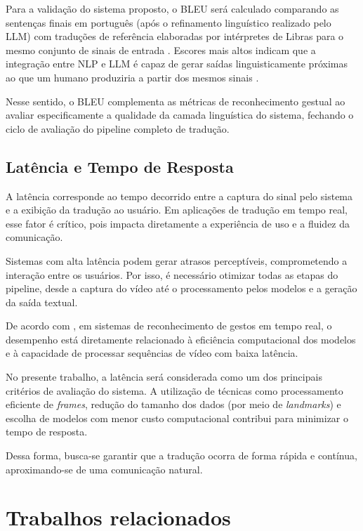 \documentclass[
    12pt,                %
    openright,           %
    oneside,             %
    a4paper,             %
    english,             %
    brazil               %
]{abntex2}
\begin{document}
Para a validação do sistema proposto, o BLEU será calculado comparando as sentenças finais em português (após o refinamento linguístico realizado pelo LLM) com traduções de referência elaboradas por intérpretes de Libras para o mesmo conjunto de sinais de entrada \cite{Touvron2023}. Escores mais altos indicam que a integração entre NLP e LLM é capaz de gerar saídas linguisticamente próximas ao que um humano produziria a partir dos mesmos sinais \cite{Touvron2023}.

Nesse sentido, o BLEU complementa as métricas de reconhecimento gestual ao avaliar especificamente a qualidade da camada linguística do sistema, fechando o ciclo de avaliação do pipeline completo de tradução.

\subsection{Latência e Tempo de Resposta}

A latência corresponde ao tempo decorrido entre a captura do sinal pelo sistema e a exibição da tradução ao usuário. Em aplicações de tradução em tempo real, esse fator é crítico, pois impacta diretamente a experiência de uso e a fluidez da comunicação.

Sistemas com alta latência podem gerar atrasos perceptíveis, comprometendo a interação entre os usuários. Por isso, é necessário otimizar todas as etapas do pipeline, desde a captura do vídeo até o processamento pelos modelos e a geração da saída textual.

De acordo com , em sistemas de reconhecimento de gestos em tempo real, o desempenho está diretamente relacionado à eficiência computacional dos modelos e à capacidade de processar sequências de vídeo com baixa latência.

No presente trabalho, a latência será considerada como um dos principais critérios de avaliação do sistema. A utilização de técnicas como processamento eficiente de \textit{frames}, redução do tamanho dos dados (por meio de \textit{landmarks}) e escolha de modelos com menor custo computacional contribui para minimizar o tempo de resposta.

Dessa forma, busca-se garantir que a tradução ocorra de forma rápida e contínua, aproximando-se de uma comunicação natural.

\section{Trabalhos relacionados}
\label{sec:trabalhos_relacionados}
\end{document}
